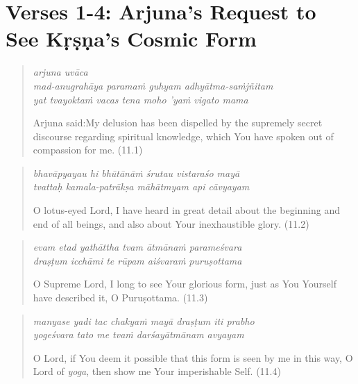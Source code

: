 \documentclass[12pt, twoside, openright]{memoir}
\begin{document}
\section{Verses 1-4: Arjuna's Request to See Kṛṣṇa's Cosmic Form}\label{sec-verses-1-4-arjuna-s-request-to-see-krsna-s-cosmic-form}

\par
\begin{verse}
\textit{arjuna uvāca} \\
\textit{mad-anugrahāya paramaṁ guhyam adhyātma-saṁjñitam} \\
\textit{yat tvayoktaṁ vacas tena moho ’yaṁ vigato mama}

\noindent \quad Arjuna said:\linebreak My delusion has been dispelled by the supremely secret discourse regarding spiritual knowledge, which You have spoken out of compassion for me. (11.1)
\end{verse}
\par



\par
\begin{verse}
\textit{bhavāpyayau hi bhūtānāṁ śrutau vistaraśo mayā} \\
\textit{tvattaḥ kamala-patrākṣa māhātmyam api cāvyayam}

\noindent O lotus-eyed Lord, I have heard in great detail about the beginning and end of all beings, and also about Your inexhaustible glory. (11.2)
\end{verse}
\par



\par
\begin{verse}
\textit{evam etad yathāttha tvam ātmānaṁ parameśvara} \\
\textit{draṣṭum icchāmi te rūpam aiśvaraṁ puruṣottama}

\noindent O Supreme Lord, I long to see Your glorious form, just as You Yourself have described it, O Puruṣottama. (11.3)
\end{verse}
\par



\par
\begin{verse}
\textit{manyase yadi tac chakyaṁ mayā draṣṭum iti prabho} \\
\textit{yogeśvara tato me tvaṁ darśayātmānam avyayam}

\noindent O Lord, if You deem it possible that this form is seen by me in this way, O Lord of \textit{yoga}, then show me Your imperishable Self. (11.4)
\end{verse}
\par
\end{document}
